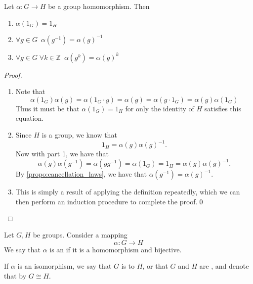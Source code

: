 \documentclass[notoc,notitlepage]{tufte-book}
\begin{document}
\begin{propo}
\label{propo:properties_of_homomorphism}
  Let $\alpha: G \to H$ be a group homomorphism. Then
  \begin{enumerate}
    \item $\alpha(1_G) = 1_H$
    \item $\forall g \in G \enspace \alpha(g^{-1}) = \alpha(g)^{-1}$
    \item $\forall g \in G \; \forall k \in \mathbb{Z} \enspace \alpha(g^k) = \alpha(g)^k$
  \end{enumerate}
\end{propo}

\begin{proof}
  \begin{enumerate}
    \item Note that
      \begin{equation*}
        \alpha(1_G) \alpha(g) = \alpha(1_G \cdot g) = \alpha(g) = \alpha(g \cdot 1_G) = \alpha(g) \alpha(1_G)
      \end{equation*}
      Thus it must be that $\alpha(1_G) = 1_H$ for only the identity of $H$ satisfies this equation.

    \item Since $H$ is a group, we know that
      \begin{equation*}
        1_H = \alpha(g)\alpha(g)^{-1}.
      \end{equation*}
      Now with part 1, we have that
      \begin{equation*}
        \alpha(g)\alpha(g^{-1}) = \alpha(gg^{-1}) = \alpha(1_G) = 1_H = \alpha(g)\alpha(g)^{-1}.
      \end{equation*}
      By \cref{propo:cancellation_laws}, we have that $\alpha(g^{-1}) = \alpha(g)^{-1}$.

    \item This is simply a result of applying the definition repeatedly, which we can then perform an induction procedure to complete the proof.\qed
  \end{enumerate}
\end{proof}

\begin{defn}[Isomorphism]
\label{defn:isomorphism}
  Let $G, H$ be groups. Consider a mapping
  \begin{equation*}
    \alpha: G \to H
  \end{equation*}
  We say that $\alpha$ is an  if it is a homomorphism and bijective.

  If $\alpha$ is an isomorphism, we say that $G$ is  to $H$, or that $G$ and $H$ are , and denote that by $G \cong H$.
\end{defn}
\end{document}

